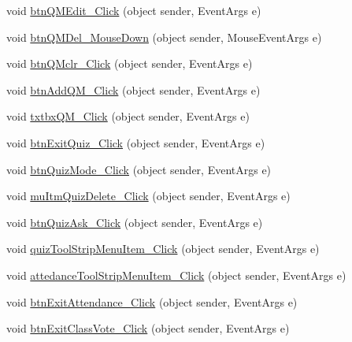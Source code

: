 \begin{DoxyCompactItemize}
void \hyperlink{class_sr_p___classroom_inq_1_1frm_classrrom_inq_a4a6869439b020d8519e10076c9583ebc}{btn\-Q\-M\-Edit\-\_\-\-Click} (object sender, \-Event\-Args e)
\item 
void \hyperlink{class_sr_p___classroom_inq_1_1frm_classrrom_inq_ad0002b32188c4505254a9230dec7fc23}{btn\-Q\-M\-Del\-\_\-\-Mouse\-Down} (object sender, \-Mouse\-Event\-Args e)
\item 
void \hyperlink{class_sr_p___classroom_inq_1_1frm_classrrom_inq_a5ecd75c32680d8896b6fcada275b474b}{btn\-Q\-Mclr\-\_\-\-Click} (object sender, \-Event\-Args e)
\item 
void \hyperlink{class_sr_p___classroom_inq_1_1frm_classrrom_inq_a61c2d094a64b65ae8b2adbd206c90326}{btn\-Add\-Q\-M\-\_\-\-Click} (object sender, \-Event\-Args e)
\item 
void \hyperlink{class_sr_p___classroom_inq_1_1frm_classrrom_inq_ad6c1b79ff1d79865275fac5a258deb2a}{txtbx\-Q\-M\-\_\-\-Click} (object sender, \-Event\-Args e)
\item 
void \hyperlink{class_sr_p___classroom_inq_1_1frm_classrrom_inq_a80183bae83a721931c21b4a8764dc289}{btn\-Exit\-Quiz\-\_\-\-Click} (object sender, \-Event\-Args e)
\item 
void \hyperlink{class_sr_p___classroom_inq_1_1frm_classrrom_inq_acfcbbf64f2bc2adf94eec18f45d2af2c}{btn\-Quiz\-Mode\-\_\-\-Click} (object sender, \-Event\-Args e)
\item 
void \hyperlink{class_sr_p___classroom_inq_1_1frm_classrrom_inq_ae486d5e846d21cf5c2616d4c0ad2e5bb}{mu\-Itm\-Quiz\-Delete\-\_\-\-Click} (object sender, \-Event\-Args e)
\item 
void \hyperlink{class_sr_p___classroom_inq_1_1frm_classrrom_inq_a62dfbfb357c98095e446b9a617c34ee9}{btn\-Quiz\-Ask\-\_\-\-Click} (object sender, \-Event\-Args e)
\item 
void \hyperlink{class_sr_p___classroom_inq_1_1frm_classrrom_inq_a73354017a84daba6bd3a574274f3904a}{quiz\-Tool\-Strip\-Menu\-Item\-\_\-\-Click} (object sender, \-Event\-Args e)
\item 
void \hyperlink{class_sr_p___classroom_inq_1_1frm_classrrom_inq_af4857322b8c22a02101857224e34e569}{attedance\-Tool\-Strip\-Menu\-Item\-\_\-\-Click} (object sender, \-Event\-Args e)
\item 
void \hyperlink{class_sr_p___classroom_inq_1_1frm_classrrom_inq_a5df71a30d5e80349884dd26718780e97}{btn\-Exit\-Attendance\-\_\-\-Click} (object sender, \-Event\-Args e)
\item 
void \hyperlink{class_sr_p___classroom_inq_1_1frm_classrrom_inq_a7de1b5ffee595dda863be7b2299e0e38}{btn\-Exit\-Class\-Vote\-\_\-\-Click} (object sender, \-Event\-Args e)

\end{DoxyCompactItemize}
